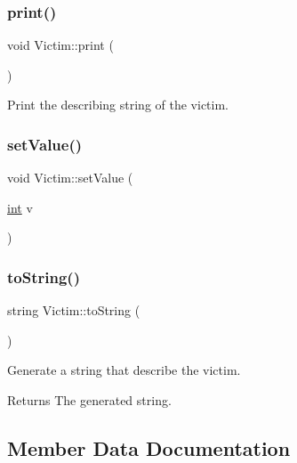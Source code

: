 \subsubsection{\texorpdfstring{print()}{print()}}
{\footnotesize\ttfamily void Victim\+::print (\begin{DoxyParamCaption}{ }\end{DoxyParamCaption})}



Print the describing string of the victim. 

\mbox{\label{class_victim_acb5121882a5728e2c4bb89b0f8ef6a8f}} 
\subsubsection{\texorpdfstring{setValue()}{setValue()}}
{\footnotesize\ttfamily void Victim\+::set\+Value (\begin{DoxyParamCaption}\item[{\mbox{\hyperlink{draw_8hh_aa620a13339ac3a1177c86edc549fda9b}{int}}}]{v }\end{DoxyParamCaption})\hspace{0.3cm}{\ttfamily [inline]}}

\mbox{\label{class_victim_aaedbd4e32daf061d175b1550aa8456ae}} 
\subsubsection{\texorpdfstring{toString()}{toString()}}
{\footnotesize\ttfamily string Victim\+::to\+String (\begin{DoxyParamCaption}{ }\end{DoxyParamCaption})}



Generate a string that describe the victim. 

\begin{DoxyReturn}{Returns}
The generated string. 
\end{DoxyReturn}


\subsection{Member Data Documentation}
\mbox{\label{class_victim_aaf8d0993ea6201011a4a1a597dc2de2e}} 
